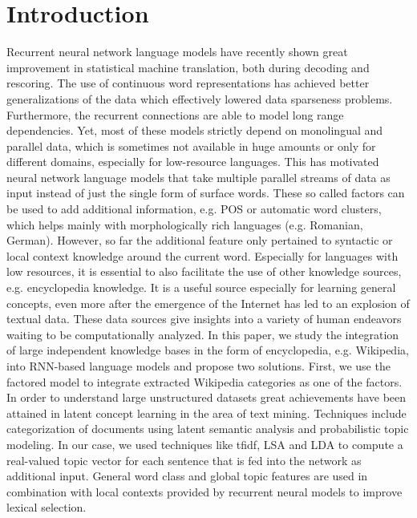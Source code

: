 \documentclass[a4paper]{article}
\begin{document}
\section{Introduction}
Recurrent neural network language models have recently shown great improvement in statistical machine translation, both during decoding and rescoring. The use of continuous word representations has achieved better generalizations of the data which effectively lowered data sparseness problems. Furthermore, the recurrent connections are able to model long range dependencies. Yet, most of these models strictly depend on monolingual and parallel data, which is sometimes not available in huge amounts or only for different domains, especially for low-resource languages.
This has motivated neural network language models that take multiple parallel streams of data as input instead of just the single form of surface words. These so called factors can be used to add additional information, e.g. POS or automatic word clusters, which helps mainly with morphologically rich languages (e.g. Romanian, German). However, so far the additional feature only pertained to syntactic or local context knowledge around the current word. Especially for languages with low resources, it is essential to also facilitate the use of other knowledge sources, e.g. encyclopedia knowledge. It is a useful source especially for learning general concepts, even more after the emergence of the Internet has led to an explosion of textual data. These data sources give insights into a variety of human endeavors waiting to be computationally analyzed.
In this paper, we study the integration of large independent knowledge bases in the form of encyclopedia, e.g. Wikipedia, into RNN-based language models and propose two solutions. 
First, we use  the factored model to integrate extracted Wikipedia categories as one of the factors. In order to understand large unstructured datasets great achievements have been attained in latent concept learning in the area of text mining. Techniques include categorization of documents using latent semantic analysis and probabilistic topic modeling. In our case, we used techniques like tfidf, LSA and LDA to compute a real-valued topic vector for each sentence that is fed into the network as additional input. 
General word class and global topic features are used in combination with local contexts provided by recurrent neural models to improve lexical selection. 
\end{document}
